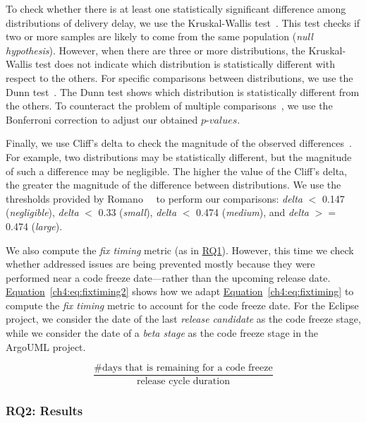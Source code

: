 To check whether there is at least one statistically significant difference
among distributions of delivery delay, we use the Kruskal-Wallis
test~\cite{kruskal1952use}. This test checks if two or more samples are likely
to come from the same population ({\em null hypothesis}). However, when there are three or
more distributions, the Kruskal-Wallis test does not indicate which distribution
is statistically different with respect to the others. For specific comparisons
between distributions, we use the Dunn test~\cite{dunn1964multiple}. The Dunn
test shows which distribution is statistically different from the others. To
counteract the problem of multiple comparisons~\cite{dunn1961multiple}, we use
the Bonferroni correction to adjust our obtained $p$-$values$.

Finally, we use Cliff's delta to check the magnitude of the observed
differences~\cite{cliff1993dominance}. For example, two distributions may be
statistically different, but the magnitude of such a difference may be
negligible. The higher the value of the Cliff's delta, the greater the magnitude
of the difference between distributions. We use the thresholds provided by
Romano~\etal~\cite{romano_2006} to perform our comparisons: {\em delta} $<$
0.147 ({\em negligible}), {\em delta} $<$ 0.33 ({\em small}), {\em delta} $<$
0.474 ({\em medium}), and {\em delta} $>=$ 0.474 ({\em large}).

We also compute the {\em fix timing} metric (as in \hyperref[ch4:rq1]{RQ1}).
However, this time we check whether addressed issues are being prevented mostly
because they were performed near a code freeze date---rather than the upcoming
release date. \hyperref[ch4:eq:fixtiming2]{Equation}~\ref{ch4:eq:fixtiming2} shows how
we adapt \hyperref[ch4:eq:fixtiming]{Equation}~\ref{ch4:eq:fixtiming} to compute the
{\em fix timing} metric to account for the code freeze date. For the Eclipse
project, we consider the date of the last {\em release candidate} as the code
freeze stage, while we consider the date of a {\em beta stage} as the code
freeze stage in the ArgoUML project.

\begin{equation}
	\frac{\text{\# days that is remaining for a code freeze}}{\text{release
	cycle duration}}
	\label{ch4:eq:fixtiming2}
\end{equation}

\subsubsection*{RQ2: Results}

